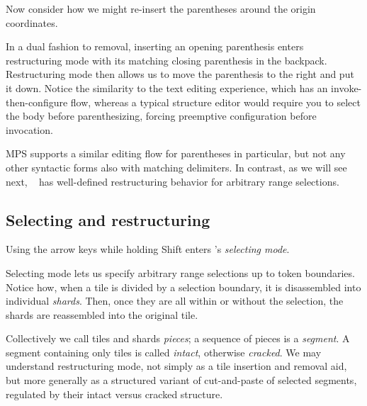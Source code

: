 Now consider how we might re-insert the parentheses
around the origin coordinates.


\noindent
In a dual fashion to removal, inserting
an opening parenthesis enters restructuring mode with its
matching closing parenthesis in the backpack.
Restructuring mode then allows us to move the parenthesis
to the right and put it down.
Notice the similarity to the text editing experience,
which has an invoke-then-configure flow, whereas a typical
structure editor would require you to select the body before
parenthesizing, forcing preemptive configuration before
invocation.

MPS supports a similar editing flow for parentheses in particular,
but not any other syntactic forms also with matching delimiters.
In contrast, as we will see next, \tylr~ has well-defined
restructuring behavior for arbitrary range selections.

\subsection{Selecting and restructuring} \label{sec:selecting-restructuring}

Using the arrow keys while holding
Shift enters \tylr's \emph{selecting mode}.


Selecting mode lets us specify arbitrary range selections up
to token boundaries.
Notice how, when a tile is divided by a selection boundary,
it is disassembled into individual \emph{shards}.
Then, once they are all within or without the selection,
the shards are reassembled into the original tile.

Collectively we call tiles and shards \emph{pieces};
a sequence of pieces is a \emph{segment}.
A segment containing only tiles is called \emph{intact},
otherwise \emph{cracked}.
We may understand restructuring mode, not simply as a tile insertion
and removal aid, but more generally as a structured variant of
cut-and-paste of selected segments, regulated by their intact versus
cracked structure.


